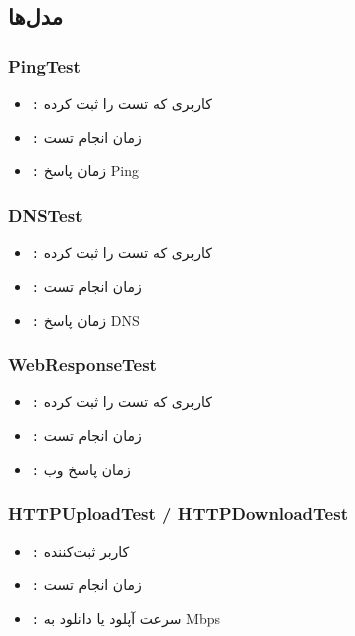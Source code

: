\documentclass{report}
\begin{document}
\subsection{مدل‌ها}
\subsubsection{PingTest}
\begin{itemize}
    \item \texttt{:} کاربری که تست را ثبت کرده
    \item \texttt{:} زمان انجام تست
    \item \texttt{:} زمان پاسخ Ping  
\end{itemize}

\subsubsection{DNSTest}
\begin{itemize}
    \item \texttt{:} کاربری که تست را ثبت کرده
    \item \texttt{:} زمان انجام تست
    \item \texttt{:} زمان پاسخ DNS  
\end{itemize}

\subsubsection{WebResponseTest}
\begin{itemize}
    \item \texttt{:} کاربری که تست را ثبت کرده 
    \item \texttt{:} زمان انجام تست
    \item \texttt{:} زمان پاسخ وب  
\end{itemize}

\subsubsection{HTTPUploadTest / HTTPDownloadTest}
\begin{itemize}
    \item \texttt{:} کاربر ثبت‌کننده
    \item \texttt{:} زمان انجام تست
    \item \texttt{:} سرعت آپلود یا دانلود به Mbps
\end{itemize}
\end{document}
